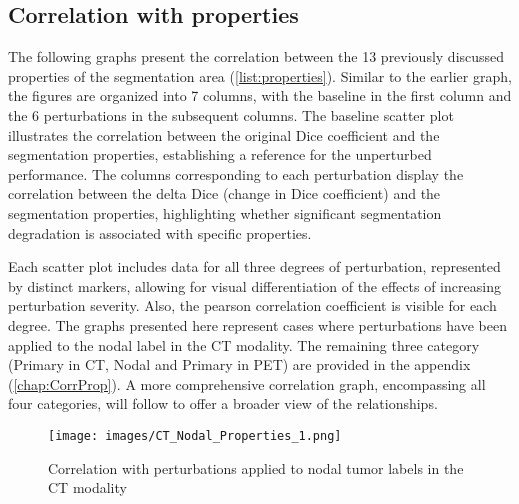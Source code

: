 \subsection{Correlation with properties}
The following graphs present the correlation between the 13 previously discussed properties of the segmentation area (\ref{list:properties}). Similar to the earlier graph, the figures are organized into 7 columns, with the baseline in the first column and the 6 perturbations in the subsequent columns. The baseline scatter plot illustrates the correlation between the original Dice coefficient and the segmentation properties, establishing a reference for the unperturbed performance. The columns corresponding to each perturbation display the correlation between the delta Dice (change in Dice coefficient) and the segmentation properties, highlighting whether significant segmentation degradation is associated with specific properties.

Each scatter plot includes data for all three degrees of perturbation, represented by distinct markers, allowing for visual differentiation of the effects of increasing perturbation severity. Also, the pearson correlation coefficient is visible for each degree.
The graphs presented here represent cases where perturbations have been applied to the nodal label in the CT modality. 
The remaining three category (Primary in CT, Nodal and Primary in PET) are provided in the appendix (\ref{chap:CorrProp}). A more comprehensive correlation graph, encompassing all 
four categories, will follow to offer a broader view of the relationships.
\begin{figure}[ht]
    \centering
    \texttt{[image: images/CT\_Nodal\_Properties\_1.png]}
    \caption{Correlation with perturbations applied to nodal tumor labels in the CT modality}
    \label{fig:three_subfigures}
\end{figure}

